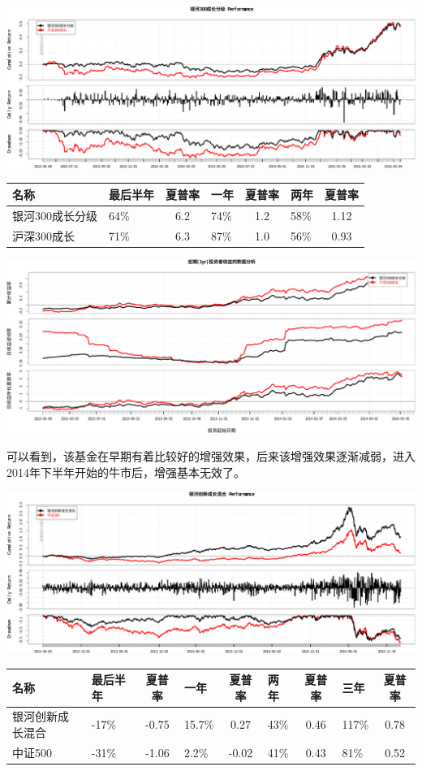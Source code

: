 \documentclass[hyperref,]{ctexart}
\begin{document}
\includegraphics{wangpei-details_files/figure-latex/unnamed-chunk-7-1.pdf}

\begin{longtable}[]{@{}llclclc@{}}
\toprule
名称 & 最后半年 & 夏普率 & 一年 & 夏普率 & 两年 & 夏普率\tabularnewline
\midrule
\endhead
银河300成长分级 & 64\% & 6.2 & 74\% & 1.2 & 58\% & 1.12\tabularnewline
沪深300成长 & 71\% & 6.3 & 87\% & 1.0 & 56\% & 0.93\tabularnewline
\bottomrule
\end{longtable}

\includegraphics{wangpei-details_files/figure-latex/unnamed-chunk-7-2.pdf}

可以看到，该基金在早期有着比较好的增强效果，后来该增强效果逐渐减弱，进入2014年下半年开始的牛市后，增强基本无效了。

\includegraphics{wangpei-details_files/figure-latex/unnamed-chunk-8-1.pdf}

\begin{longtable}[]{@{}llclclclc@{}}
\toprule
名称 & 最后半年 & 夏普率 & 一年 & 夏普率 & 两年 & 夏普率 & 三年 &
夏普率\tabularnewline
\midrule
\endhead
银河创新成长混合 & -17\% & -0.75 & 15.7\% & 0.27 & 43\% & 0.46 & 117\% &
0.78\tabularnewline
中证500 & -31\% & -1.06 & 2.2\% & -0.02 & 41\% & 0.43 & 81\% &
0.52\tabularnewline
\bottomrule
\end{longtable}
\end{document}
